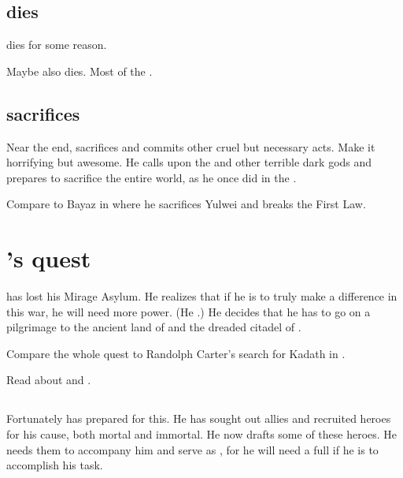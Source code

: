 \subsection{\Harbeth dies}
\Harbeth dies for some reason. 

Maybe \Zereth also dies. 
Most of the . 








\subsection{\Ishnaruchaefir sacrifices \Criseis}
Near the end, \Ishnaruchaefir sacrifices \Criseis and commits other cruel but necessary acts. 
Make it horrifying but awesome. 
He calls upon the \xss and other terrible dark gods and prepares to sacrifice the entire world, as he once did in the . 

Compare to Bayaz in \cite{JoeAbercrombie:LastArgumentofKings} where he sacrifices Yulwei and breaks the First Law. 















\section{\Ishnaruchaefir's quest}
\Ishnaruchaefir has lost his Mirage Asylum. 
He realizes that if he is to truly make a difference in this war, he will need more power.
(He .)
He decides that he has to go on a pilgrimage to the ancient \draconian land of \Dragonland and the dreaded citadel of . 

Compare the whole quest to Randolph Carter's search for Kadath in \cite{HPLovecraft:TheDreamQuestofUnknownKadath}. 

Read about  and .









\subsection{\Matrix}
Fortunately \Ishnaruchaefir has prepared for this. 
He has sought out allies and recruited heroes for his cause, both mortal and immortal. 
He now drafts some of these heroes.
He needs them to accompany him and serve as \vertices, for he will need a full  if he is to accomplish his task. 

